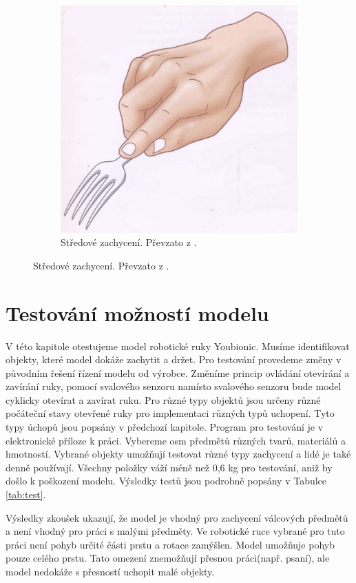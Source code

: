 \documentclass[thesis=B,czech]{FITthesis}[2012/06/26]
\begin{document}
\begin{figure}[H]
\begin{subfigure}{.4\textwidth}
  \includegraphics[width=.6\linewidth]{./image/centSimpGrip.png}
  \caption{Středové zachycení. Převzato z \cite{PhysJoin}.}
  \label{fig:centSimpGrip}
\end{subfigure}
\label{fig:test}

\end{figure} 
 
 

\chapter{Testování možností modelu}
\label{ch:test}

V této kapitole otestujeme model robotické ruky Youbionic. Musíme identifikovat objekty, které model dokáže zachytit a držet. Pro testování provedeme změny v původním  řešení řízení modelu od výrobce. Změníme princip ovládání otevírání a zavírání ruky, pomocí svalového senzoru namísto svalového senzoru bude model cyklicky otevírat a zavírat ruku. Pro různé typy objektů jsou určeny různé počáteční stavy otevřené ruky pro implementaci různých typů uchopení. Tyto typy úchopů jsou popsány v předchozí kapitole. Program pro testování je v elektronické příloze k práci. Vybereme osm předmětů různých tvarů, materiálů a hmotností. Vybrané objekty umožňují testovat různé typy zachycení a lidé je také denně používají. Všechny položky váží méně než 0,6 kg pro testování, aniž by došlo k poškození modelu. Výsledky testů jsou podrobně popsány v Tabulce \ref{tab:test}.


Výsledky zkoušek ukazují, že model je vhodný pro zachycení válcových předmětů a není vhodný pro práci s malými předměty. Ve robotické ruce vybrané pro tuto práci není pohyb určité části prstu a rotace zamýšlen. Model umožňuje pohyb pouze celého prstu. Tato omezení znemožňují přesnou práci(např. psaní), ale model nedokáže s přesností uchopit malé objekty. 
\end{document}
